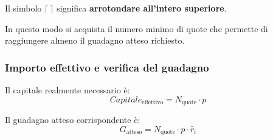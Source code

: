 \noindent
Il simbolo $\lceil\ \rceil$ significa
\textbf{arrotondare all'intero superiore}.

\noindent
In questo modo si acquista il numero minimo di quote
che permette di raggiungere almeno il guadagno atteso richiesto.

\subsubsection*{Importo effettivo e verifica del guadagno}

\noindent
Il capitale realmente necessario è:
\[
    Capitale_{\text{effettivo}}
    =
    N_{\text{quote}}\cdot p
\]

\noindent
Il guadagno atteso corrispondente è:
\[
    G_{\text{atteso}}
    =
    N_{\text{quote}}\cdot p\cdot\widehat r_i
\]

\par
\endgroup